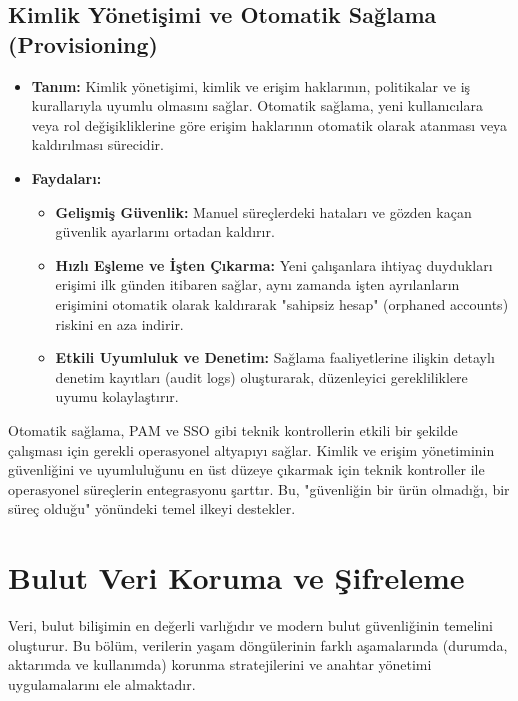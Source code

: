 \subsection{Kimlik Yönetişimi ve Otomatik Sağlama (Provisioning)}
\begin{itemize}
    \item \textbf{Tanım:} Kimlik yönetişimi, kimlik ve erişim haklarının, politikalar ve iş kurallarıyla uyumlu olmasını sağlar. Otomatik sağlama, yeni kullanıcılara veya rol değişikliklerine göre erişim haklarının otomatik olarak atanması veya kaldırılması sürecidir.
    \item \textbf{Faydaları:}
    \begin{itemize}
        \item \textbf{Gelişmiş Güvenlik:} Manuel süreçlerdeki hataları ve gözden kaçan güvenlik ayarlarını ortadan kaldırır.
        \item \textbf{Hızlı Eşleme ve İşten Çıkarma:} Yeni çalışanlara ihtiyaç duydukları erişimi ilk günden itibaren sağlar, aynı zamanda işten ayrılanların erişimini otomatik olarak kaldırarak "sahipsiz hesap" (orphaned accounts) riskini en aza indirir.
        \item \textbf{Etkili Uyumluluk ve Denetim:} Sağlama faaliyetlerine ilişkin detaylı denetim kayıtları (audit logs) oluşturarak, düzenleyici gerekliliklere uyumu kolaylaştırır.
    \end{itemize}
\end{itemize}
Otomatik sağlama, PAM ve SSO gibi teknik kontrollerin etkili bir şekilde çalışması için gerekli operasyonel altyapıyı sağlar. Kimlik ve erişim yönetiminin güvenliğini ve uyumluluğunu en üst düzeye çıkarmak için teknik kontroller ile operasyonel süreçlerin entegrasyonu şarttır. Bu, "güvenliğin bir ürün olmadığı, bir süreç olduğu" yönündeki temel ilkeyi destekler.

\section{Bulut Veri Koruma ve Şifreleme}
Veri, bulut bilişimin en değerli varlığıdır ve modern bulut güvenliğinin temelini oluşturur. Bu bölüm, verilerin yaşam döngülerinin farklı aşamalarında (durumda, aktarımda ve kullanımda) korunma stratejilerini ve anahtar yönetimi uygulamalarını ele almaktadır.

